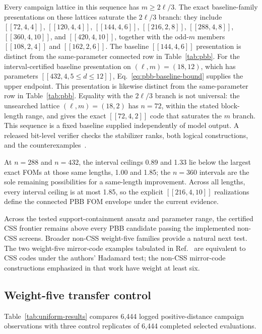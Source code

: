 \documentclass[aps,prx,twocolumn,superscriptaddress,nofootinbib,floatfix]{revtex4-2}
\newcommand{\code}[1]{\ensuremath{\left[\!\left[#1\right]\!\right]}}
\begin{document}
Every campaign lattice in this sequence has $m\geq2\ell/3$.  The exact
baseline-family presentations on these lattices saturate the $2\ell/3$ branch:
they include
$\code{72,4,4}$, $\code{120,4,4}$,
$\code{144,4,6}$,
$\code{216,2,8}$, $\code{288,4,8}$, $\code{360,4,10}$, and
$\code{420,4,10}$, together with the odd-$m$ members
$\code{108,2,4}$ and $\code{162,2,6}$.  The baseline $\code{144,4,6}$
presentation is distinct from the same-parameter connected row in
Table~\ref{tab:pbb}.  For the interval-certified baseline presentation on
$(\ell,m)=(18,12)$, which has parameters
$\code{432,4,5\leq d\leq12}$, Eq.~\eqref{eq:pbb-baseline-bound} supplies the
upper endpoint.  This presentation is likewise distinct from the
same-parameter row in Table~\ref{tab:pbb}.  Equality with the $2\ell/3$ branch
is not universal: the unsearched lattice $(\ell,m)=(18,2)$ has $n=72$, within
the stated block-length range, and gives the exact $\code{72,4,2}$ code that
saturates the $m$ branch.  This sequence is a
fixed baseline supplied independently of model output.  A released bit-level
verifier checks the stabilizer ranks, both logical constructions, and the
counterexamples~\cite{cruzbenito2026qcode}.

At $n=288$ and $n=432$, the interval ceilings 0.89 and 1.33 lie below the
largest exact FOMs at those same lengths, 1.00 and 1.85; the $n=360$ intervals
are the sole remaining possibilities for a same-length improvement.  Across
all lengths, every interval ceiling is at most 1.85, so the explicit
$\code{216,4,10}$ realizations define the connected PBB FOM envelope under the
current evidence.

Across the tested support-containment ansatz and parameter range, the certified
CSS frontier remains above every PBB candidate passing the implemented non-CSS
screens.  Broader non-CSS weight-five families provide a natural next test.
The two
weight-five mirror-code examples tabulated in Ref.~\cite{khesin2026mirror}
are equivalent to CSS codes under the authors' Hadamard test; the non-CSS
mirror-code constructions emphasized in that work have weight at least six.

\subsection{Weight-five transfer control}
\label{sec:uniform-results}

Table~\ref{tab:uniform-results} compares 6,444 logged positive-distance
campaign observations with three control replicates of 6,444 completed
selected evaluations.
\end{document}
